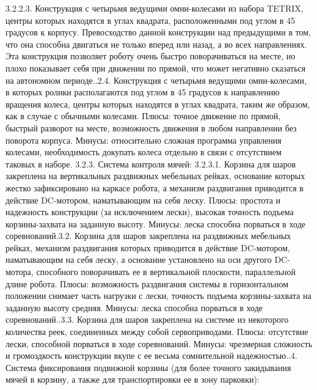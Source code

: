 \documentclass[12pt]{article}
\begin{document}
\begin{enumerate}
	      	3.2.2.3.	Конструкция с четырьмя ведущими омни-колесами из набора TETRIX, центры которых находятся в углах квадрата, расположенными под углом в 45 градусов к корпусу. Превосходство данной конструкции над предыдущими в том, что она способна двигаться не только вперед или назад, а во всех направлениях. Эта конструкция позволяет роботу очень быстро поворачиваться на месте, но плохо показывает себя при движении по прямой, что может негативно сказаться на автономном периоде..2.4.	 Конструкция с четырьмя ведущими омни-колесами, в которых ролики располагаются под углом в 45 градусов к направлению вращения колеса, центры которых находятся в углах квадрата, таким же образом, как в случае с обычными колесами. Плюсы: точное движение по прямой, быстрый разворот на месте, возможность движения в любом направлении без поворота корпуса. Минусы: относительно сложная программа управления колесами, необходимость докупать колеса отдельно в связи с отсутствием таковых в наборе.
	      	3.2.3.	Система контроля мячей:
	      	3.2.3.1.	Корзина для шаров закреплена на вертикальных раздвижных мебельных рейках, основание которых жестко зафиксировано на каркасе робота, а механизм раздвигания приводится в действие DC-мотором, наматывающим на себя леску. Плюсы: простота и надежность конструкции (за исключением лески), высокая точность подъема корзины-захвата на заданную высоту. Минусы: леска способна порваться в ходе соревнований.3.2.	Корзина для шаров закреплена на раздвижных мебельных рейках, механизм раздвигания которых приводится в действие DC-мотором, наматывающим на себя леску, а основание установлено на оси другого DC-мотора, способного поворачивать ее в вертикальной плоскости, параллельной длине робота. Плюсы: возможность раздвигания системы в горизонтальном положении снимает часть нагрузки с лески, точность подъема корзины-захвата на заданную высоту средняя. Минусы: леска способна порваться в ходе соревнований..3.3.	Корзина для шаров закреплена на системе из некоторого количества реек, соединенных между собой сервоприводами. Плюсы: отсутствие лески, способной порваться в ходе соревнований. Минусы: чрезмерная сложность и громоздкость конструкции вкупе с ее весьма сомнительной надежностью..4.	Система фиксирования подвижной корзины (для более точного закидывания мячей в корзину, а также для транспортировки ее в зону парковки):\newline

\end{enumerate}
\end{document}
